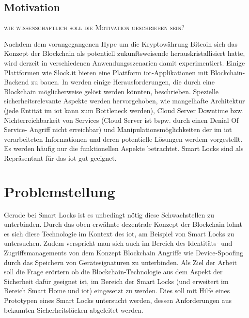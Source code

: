     \subsection*{Motivation}
    \textsc{wie wissenschaftlich soll die Motivation geschrieben sein?}
    
    Nachdem dem vorangegangenen Hype um die Kryptowährung Bitcoin sich das Konzept der Blockchain als potentiell zukunftsweisende herauskristallisiert hatte, wird derzeit in verschiedenen Anwendungsszenarien damit experimentiert. 
    Einige Plattformen wie Slock.it bieten eine Plattform \gls{iot}-Applikationen mit Blockchain-Backend zu bauen. 
    In \cite{Kshetri2017} werden einige Herausforderungen, die durch eine Blockchain möglicherweise gelöst werden könnten, beschrieben. 
    Spezielle sicherheitsrelevante Aspekte werden hervorgehoben, wie mangelhafte Architektur (jede Entität im \gls{iot} kann zum Bottleneck werden), Cloud Server Downtime bzw. Nichterreichbarkeit von Services (Cloud Server ist bspw. durch einen Denial Of Service- Angriff nicht erreichbar) und Manipulationsmöglichkeiten der im \gls{iot} verarbeiteten Informationen  und deren potentielle Lösungen werdem vorgestellt. 
    Es werden häufig nur die funktionellen Aspekte betrachtet. 
    Smart Locks sind als Repräsentant für das \gls{iot} gut geeignet.
    
\section{Problemstellung}
\label{sec:problem}
    Gerade bei Smart Locks ist es unbedingt nötig diese Schwachstellen zu unterbinden.
    Durch das oben erwähnte dezentrale Konzept der Blockchain\cite{Nakamoto2008} lohnt es sich diese Technologie im Kontext des \gls{iot}, am Beispiel von Smart Locks zu untersuchen.
    Zudem verspricht man sich auch im Bereich des Identitäts- und Zugriffsmanagements von dem Konzept Blockchain Angriffe wie Device-Spoofing durch das Speichern von Gerätesignaturen zu unterbinden\cite{Kshetri2017}.
    \newline
    \noindent Als Ziel der Arbeit soll die Frage erörtern ob die Block\-chain\--Tech\-no\-lo\-gie aus dem Aspekt der Sicherheit dafür geeignet ist, im Bereich der Smart Locks (und erweitert im Bereich Smart Home und \gls{iot}) eingesetzt zu werden.
    Dies soll mit Hilfe eines Prototypen eines Smart Locks untersucht werden, dessen Anforderungen aus bekannten Sicherheitslücken abgeleitet werden.
    
